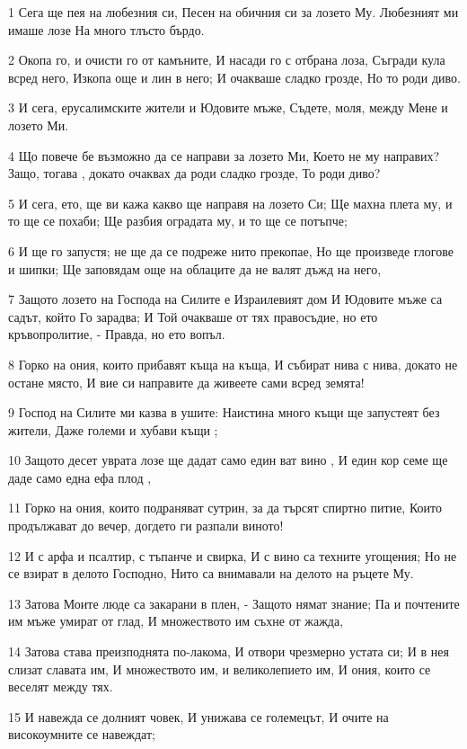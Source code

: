 \par 1 Сега ще пея на любезния си, Песен на обичния си за лозето Му. Любезният ми имаше лозе На много тлъсто бърдо.
\par 2 Окопа го, и очисти го от камъните, И насади го с отбрана лоза, Съгради кула всред него, Изкопа още и лин в него; И очакваше сладко грозде, Но то роди диво.
\par 3 И сега, ерусалимските жители и Юдовите мъже, Съдете, моля, между Мене и лозето Ми.
\par 4 Що повече бе възможно да се направи за лозето Ми, Което не му направих? Защо, тогава , докато очаквах да роди сладко грозде, То роди диво?
\par 5 И сега, ето, ще ви кажа какво ще направя на лозето Си; Ще махна плета му, и то ще се похаби; Ще разбия оградата му, и то ще се потъпче;
\par 6 И ще го запустя; не ще да се подреже нито прекопае, Но ще произведе глогове и шипки; Ще заповядам още на облаците да не валят дъжд на него,
\par 7 Защото лозето на Господа на Силите е Израилевият дом И Юдовите мъже са садът, който Го зарадва; И Той очакваше от тях правосъдие, но ето кръвопролитие, - Правда, но ето вопъл.
\par 8 Горко на ония, които прибавят къща на къща, И събират нива с нива, докато не остане място, И вие си направите да живеете сами всред земята!
\par 9 Господ на Силите ми казва в ушите: Наистина много къщи ще запустеят без жители, Даже големи и хубави къщи ;
\par 10 Защото десет уврата лозе ще дадат само един ват вино , И един кор семе ще даде само една ефа плод ,
\par 11 Горко на ония, които подраняват сутрин, за да търсят спиртно питие, Които продължават до вечер, догдето ги разпали виното!
\par 12 И с арфа и псалтир, с тъпанче и свирка, И с вино са техните угощения; Но не се взират в делото Господно, Нито са внимавали на делото на ръцете Му.
\par 13 Затова Моите люде са закарани в плен, - Защото нямат знание; Па и почтените им мъже умират от глад, И множеството им съхне от жажда,
\par 14 Затова става преизподнята по-лакома, И отвори чрезмерно устата си; И в нея слизат славата им, И множеството им, и великолепието им, И ония, които се веселят между тях.
\par 15 И навежда се долният човек, И унижава се големецът, И очите на високоумните се навеждат;
